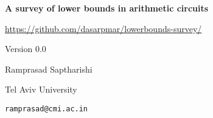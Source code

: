 \documentclass[12pt]{report}
\newcommand{\currentversion}{0.0}
\begin{document}
\begin{titlepage}
  \vspace*{4cm}
  \begin{center}
    {\Huge {\bf A survey of lower bounds in arithmetic circuits}}
  
    \vspace*{2cm}

    {\large \url{https://github.com/dasarpmar/lowerbounds-survey/}}
    
    {\large Version \currentversion}

    \vfill
    
    {\Large Ramprasad Saptharishi}

    {\large Tel Aviv University}

    {\large \texttt{ramprasad@cmi.ac.in}}
\end{center}
\end{titlepage}


\end{document}
